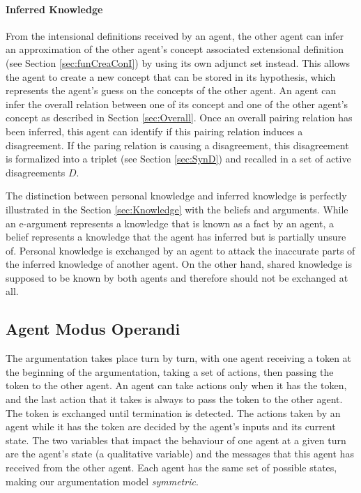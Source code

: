 \paragraph{Inferred Knowledge}

From the intensional definitions received by an agent, the other agent can infer an approximation of the other agent's concept associated extensional definition (see Section \ref{sec:funCreaConI}) by using its own adjunct set instead. This allows the agent to create a new concept that can be stored in its hypothesis, which represents the agent's guess on the concepts of the other agent. An agent can infer the overall relation between one of its concept and one of the other agent's concept as described in Section \ref{sec:Overall}. Once an overall pairing relation has been inferred, this agent can identify if this pairing relation induces a disagreement. If the paring relation is causing a disagreement, this disagreement is formalized into a triplet (see Section \ref{sec:SynD}) and recalled in a set of active disagreements $D$.

The distinction between personal knowledge and inferred knowledge is perfectly illustrated in the Section \ref{sec:Knowledge} with the beliefs and arguments. While an e-argument represents a knowledge that is known as a fact by an agent, a belief represents a knowledge that the agent has inferred but is partially unsure of. Personal knowledge is exchanged by an agent to attack the inaccurate parts of the inferred knowledge of another agent. On the other hand, shared knowledge is supposed to be known by both agents and therefore should not be exchanged at all.

\subsection{Agent Modus Operandi}
\label{sec:ModusOperandi}

The argumentation takes place turn by turn, with one agent receiving a token at the beginning of the argumentation, taking a set of actions, then passing the token to the other agent. An agent can take actions only when it has the token, and the last action that it takes is always to pass the token to the other agent. The token is exchanged until termination is detected. The actions taken by an agent while it has the token are decided by the agent's inputs and its current state. The two variables that impact the behaviour of one agent at a given turn are the agent's state (a qualitative variable) and the messages that this agent has received from the other agent. Each agent has the same set of possible states, making our argumentation model \emph{symmetric}.

